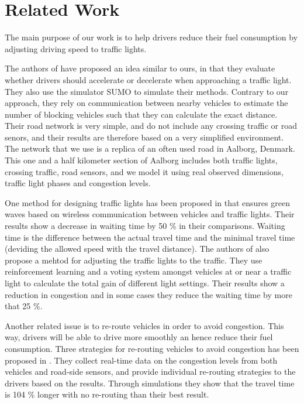 \section{Related Work}\label{sec:RelatedWork}

The main purpose of our work is to help drivers reduce their fuel consumption by adjusting driving speed to traffic lights.

The authors of \cite{VANETsim} have proposed an idea similar to ours, in that they evaluate whether drivers should accelerate or decelerate when approaching a traffic light.
They also use the simulator SUMO to simulate their methods. 
Contrary to our approach, they rely on communication between nearby vehicles to estimate the number of blocking vehicles such that they can calculate the exact distance.
Their road network is very simple, and do not include any crossing traffic or road senors, and their results are therefore based on a very simplified environment. 
The network that we use is a replica of an often used road in Aalborg, Denmark. 
This one and a half kilometer section of Aalborg includes both traffic lights, crossing traffic, road sensors, and we model it using real observed dimensions, traffic light phases and congestion levels.

One method for designing traffic lights has been proposed in \cite{SOTL} that ensures green waves based on wireless communication between vehicles and traffic lights. 
Their results show a decrease in waiting time by 50 \% in their comparisons. 
Waiting time is the difference between the actual travel time and the minimal travel time (deviding the allowed speed with the travel distance).
The authors of \cite{ITLC} also propose a mehtod for adjusting the traffic lights to the traffic. 
They use reinforcement learning and a voting system amongst vehicles at or near a traffic light to calculate the total gain of different light settings. 
Their results show a reduction in congestion and in some cases they reduce the waiting time by more that 25 \%.

Another related issue is to re-route vehicles in order to avoid congestion. 
This way, drivers will be able to drive more smoothly an hence reduce their fuel consumption. 
Three strategies for re-routing vehicles to avoid congestion has been proposed in \cite{congestionAvoidance}. 
They collect real-time data on the congestion levels from both vehicles and road-side sensors, and provide individual re-routing strategies to the drivers based on the results. 
Through simulations they show that the travel time is 104 \% longer with no re-routing than their best result.

